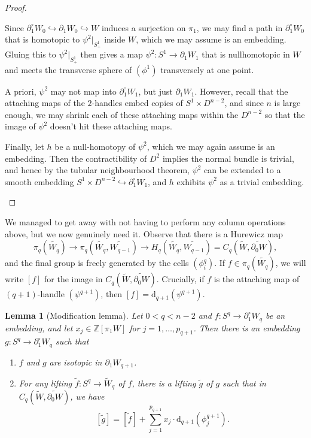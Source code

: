 \documentclass[a4paper, 12pt]{article}
\newtheorem{lemma}[thm]{Lemma}
\theoremstyle{definition}
\newcommand\Z{\mathbb{Z}}
\begin{document}
\begin{proof}
\begin{itemize}
      Since $\partial_1^\circ W_0 \hookrightarrow \partial_1 W_0 \hookrightarrow W$ induces a surjection on $\pi_1$, we may find a path in $\partial_1^\circ W_0$ that is homotopic to $\psi^2|_{S^1_+}$ inside $W$, which we may assume is an embedding. Gluing this to $\psi^2|_{S^1_+}$ then gives a map $\psi^2: S^1 \to \partial_1 W_1$ that is nullhomotopic in $W$ and meets the transverse sphere of $(\phi^1)$ transversely at one point.

      A priori, $\psi^2$ may not map into $\partial_1^\circ W_1$, but just $\partial_1 W_1$. However, recall that the attaching maps of the $2$-handles embed copies of $S^1 \times D^{n - 2}$, and since $n$ is large enough, we may shrink each of these attaching maps within the $D^{n - 2}$ so that the image of $\psi^2$ doesn't hit these attaching maps.

      Finally, let $h$ be a null-homotopy of $\psi^2$, which we may again assume is an embedding. Then the contractibility of $D^2$ implies the normal bundle is trivial, and hence by the tubular neighbourhood theorem, $\psi^2$ can be extended to a smooth embedding $S^1 \times D^{n - 2} \hookrightarrow \partial_1^\circ W_1$, and $h$ exhibits $\psi^2$ as a trivial embedding.\qedhere
  \end{itemize}
\end{proof}

We managed to get away with not having to perform any column operations above, but we now genuinely need it. Observe that there is a Hurewicz map
\[
  \pi_q(\widetilde{W_q}) \to \pi_q(\widetilde{W_q}, \widetilde{W_{q - 1}}) \to H_q(\widetilde{W_q}, \widetilde{W_{q - 1}}) = C_q(\tilde{W}, \widetilde{\partial_0 W}),
\]
and the final group is freely generated by the cells $(\phi^q_i)$. If $f \in \pi_q(\widetilde{W_q})$, we will write $[f]$ for the image in $C_q(\tilde{W}, \widetilde{\partial_0 W})$. Crucially, if $f$ is the attaching map of $(q + 1)$-handle $(\psi^{q + 1})$, then $[f] = \mathrm{d}_{q + 1} (\psi^{q + 1})$.
\begin{lemma}[Modification lemma]\label{lemma:modification}
  Let $0 < q < n - 2$ and $f: S^q \to \partial_1^\circ W_q$ be an embedding, and let $x_j \in \Z[\pi_1 W]$ for $j = 1 ,\ldots, p_{q + 1}$. Then there is an embedding $g: S^q \to \partial_1^\circ W_q$ such that
  \begin{enumerate}
    \item $f$ and $g$ are isotopic in $\partial_1 W_{q + 1}$.
    \item For any lifting $\tilde{f}: S^q \to \tilde{W}_q$ of $f$, there is a lifting $\tilde{g}$ of $g$ such that in $C_q(\tilde{W}, \widetilde{\partial_0 W})$, we have
      \[
        [\tilde{g}] = [\tilde{f}] + \sum_{j = 1}^{p_{q + 1}} x_j \cdot \mathrm{d}_{q + 1} (\phi_j^{q + 1}).
      \]
  \end{enumerate}
\end{lemma}
\end{document}
